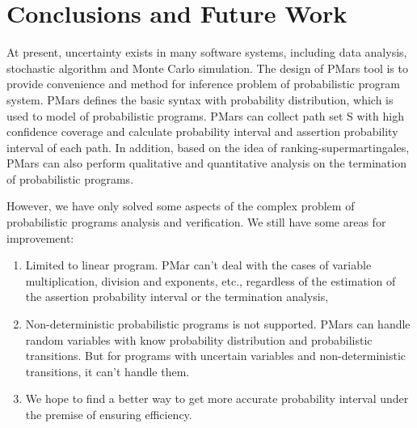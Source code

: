 \section{Conclusions and Future Work}
At present, uncertainty exists in many software systems, including data analysis, stochastic algorithm and Monte Carlo simulation. The design of PMars tool is to provide convenience and method for inference problem of probabilistic program system. PMars defines the basic syntax with probability distribution, which is used to model of probabilistic programs. PMars can collect path set S with high confidence coverage and calculate probability interval and assertion probability interval of each path. In addition, based on the idea of ranking-supermartingales, PMars can also perform qualitative and quantitative analysis on the termination of probabilistic programs.


However, we have only solved some aspects of the complex problem of probabilistic programs analysis and verification. We still have some areas for improvement:
\begin{enumerate}
	\item Limited to linear program. PMar can't deal with the cases of variable multiplication, division and exponents, etc., regardless of the estimation of the assertion probability interval or the termination analysis,
	\item Non-deterministic probabilistic programs is not supported. PMars can handle random variables with know probability distribution and probabilistic transitions. But for programs with uncertain variables and non-deterministic transitions, it can't handle them.
	\item We hope to find a better way to get more accurate probability interval under the premise of ensuring efficiency. 
\end{enumerate}




\appendix

